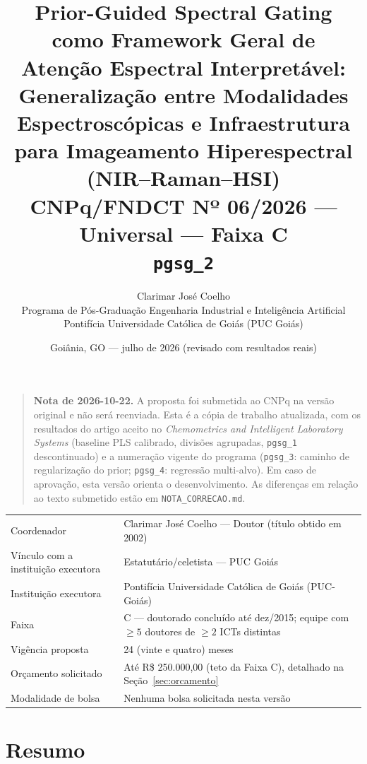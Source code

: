 \documentclass[11pt,a4paper]{article}
\title{\textbf{Prior-Guided Spectral Gating como Framework Geral de\\
Atenção Espectral Interpretável: Generalização entre Modalidades\\
Espectroscópicas e Infraestrutura para Imageamento Hiperespectral\\
(NIR--Raman--HSI)}\\[0.4cm]
\large CNPq/FNDCT Nº 06/2026 --- Universal --- Faixa C\\
\normalsize \texttt{pgsg\_2}}
\author{Clarimar José Coelho \\
\small Programa de Pós-Graduação Engenharia Industrial e Inteligência Artificial \\
\small Pontifícia Universidade Católica de Goiás (PUC Goiás)}
\date{Goiânia, GO --- julho de 2026 (revisado com resultados reais)}
\begin{document}
\maketitle

\begin{quote}
\small\textbf{Nota de 2026-10-22.} A proposta foi submetida ao CNPq na versão
original e não será reenviada. Esta é a cópia de trabalho atualizada, com os
resultados do artigo aceito no \emph{Chemometrics and Intelligent Laboratory
Systems} (baseline PLS calibrado, divisões agrupadas, \texttt{pgsg\_1}
descontinuado) e a numeração vigente do programa (\texttt{pgsg\_3}: caminho de
regularização do prior; \texttt{pgsg\_4}: regressão multi-alvo). Em caso de
aprovação, esta versão orienta o desenvolvimento. As diferenças em relação ao
texto submetido estão em \texttt{NOTA\_CORRECAO.md}.
\end{quote}


\begin{center}
\begin{tabular}{ll}
\toprule
Coordenador & Clarimar José Coelho --- Doutor (título obtido em 2002) \\
Vínculo com a instituição executora & Estatutário/celetista --- PUC Goiás \\
Instituição executora & Pontifícia Universidade Católica de Goiás (PUC-Goiás) \\
Faixa & C --- doutorado concluído até dez/2015; equipe com $\geq 5$ doutores de $\geq 2$ ICTs distintas \\
Vigência proposta & 24 (vinte e quatro) meses \\
Orçamento solicitado & Até R\$ 250.000,00 (teto da Faixa C), detalhado na Seção~\ref{sec:orcamento} \\
Modalidade de bolsa & Nenhuma bolsa solicitada nesta versão \\
\bottomrule
\end{tabular}
\end{center}

\tableofcontents

\section{Resumo}
\end{document}
